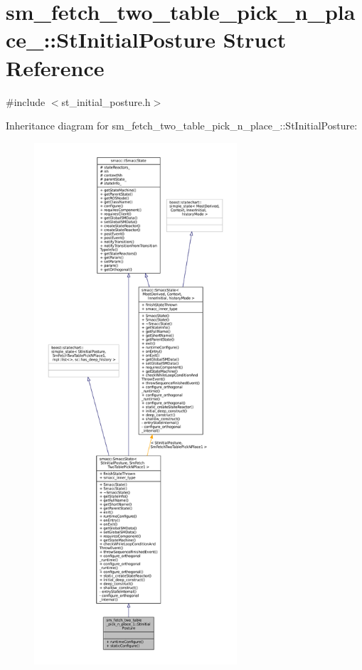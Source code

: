 \hypertarget{structsm__fetch__two__table__pick__n__place__1_1_1StInitialPosture}{}\section{sm\+\_\+fetch\+\_\+two\+\_\+table\+\_\+pick\+\_\+n\+\_\+place\+\_\+:\+:St\+Initial\+Posture Struct Reference}
\label{structsm__fetch__two__table__pick__n__place__1_1_1StInitialPosture}


{\ttfamily \#include $<$st\+\_\+initial\+\_\+posture.\+h$>$}



Inheritance diagram for sm\+\_\+fetch\+\_\+two\+\_\+table\+\_\+pick\+\_\+n\+\_\+place\+\_\+:\+:St\+Initial\+Posture\+:
\nopagebreak
\begin{figure}[H]
\begin{center}
\leavevmode
\includegraphics[height=550pt]{structsm__fetch__two__table__pick__n__place__1_1_1StInitialPosture__inherit__graph}
\end{center}
\end{figure}


